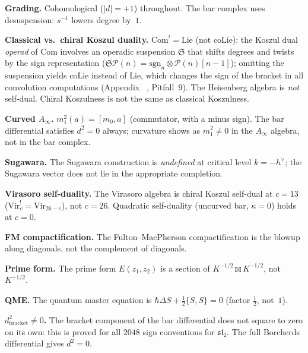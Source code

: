 \documentclass[11pt]{report}
\makeatletter
\theoremstyle{definition}
\theoremstyle{remark}
\numberwithin{equation}{section}
\let\svy@oldref\ref
\renewcommand{\ref}[1]{%
 \@ifundefined{r@#1}{\textit{full monograph}}{\svy@oldref{#1}}%
}
\makeatother
\begin{document}
\smallskip\noindent\textbf{Grading.}
Cohomological ($|d| = +1$) throughout. The bar complex uses desuspension: $s^{-1}$ lowers degree by~$1$.

\smallskip\noindent\textbf{Classical vs.\ chiral Koszul duality.}
$\mathrm{Com}^! = \mathrm{Lie}$ (not $\mathrm{coLie}$):
the Koszul dual \emph{operad} of $\mathrm{Com}$ involves
an operadic suspension $\mathfrak{S}$ that shifts degrees
and twists by the sign representation
($\mathfrak{S}\mathcal{P}(n)
= \mathrm{sgn}_n \otimes \mathcal{P}(n)[n{-}1]$);
omitting the suspension yields $\mathrm{coLie}$ instead
of $\mathrm{Lie}$, which changes the sign of the
bracket in all convolution computations
(Appendix~\ref{app:signs}, Pitfall~9).
The Heisenberg algebra is \emph{not} self-dual.
Chiral Koszulness is not the same as classical
Koszulness.

\smallskip\noindent\textbf{Curved $A_\infty$.}
$m_1^2(a) = [m_0, a]$ (commutator, with a minus sign). The bar differential satisfies $d^2 = 0$ always; curvature shows as $m_1^2 \neq 0$ in the $A_\infty$ algebra, not in the bar complex.

\smallskip\noindent\textbf{Sugawara.}
The Sugawara construction is \emph{undefined} at critical level $k = -h^\vee$; the Sugawara vector does not lie in the appropriate completion.

\smallskip\noindent\textbf{Virasoro self-duality.}
The Virasoro algebra is chiral Koszul self-dual at $c = 13$ ($\mathrm{Vir}_c^! = \mathrm{Vir}_{26-c}$), not $c = 26$. Quadratic self-duality (uncurved bar, $\kappa = 0$) holds at $c = 0$.

\smallskip\noindent\textbf{FM compactification.}
The Fulton--MacPherson compactification is the blowup along diagonals, not the complement of diagonals.

\smallskip\noindent\textbf{Prime form.}
The prime form $E(z_1, z_2)$ is a section of $K^{-1/2} \boxtimes K^{-1/2}$, not $K^{+1/2}$.

\smallskip\noindent\textbf{QME.}
The quantum master equation is $\hbar \Delta S + \frac{1}{2}\{S, S\} = 0$ (factor $\frac{1}{2}$, not~$1$).

\smallskip\noindent\textbf{$d_{\mathrm{bracket}}^2 \neq 0$.}
The bracket component of the bar differential does not square to zero on its own: this is proved for all $2048$ sign conventions for $\mathfrak{sl}_2$. The full Borcherds differential gives $d^2 = 0$.

\clearpage

\end{document}
